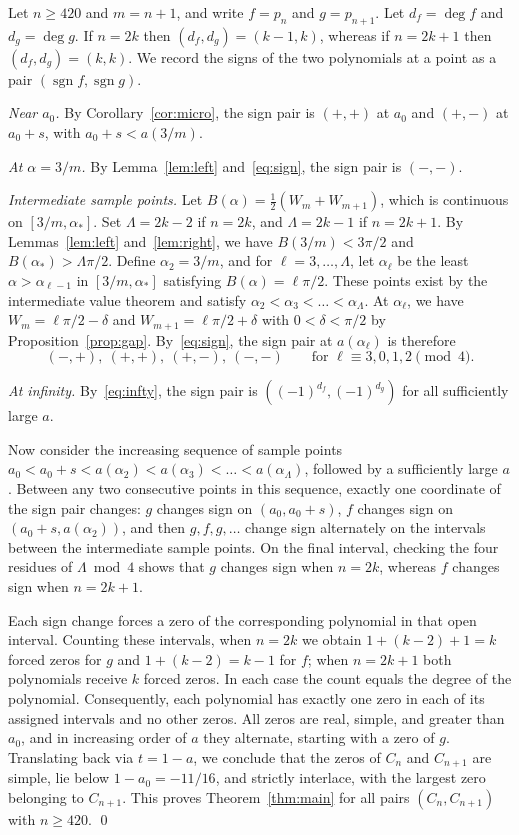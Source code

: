\documentclass[11pt]{amsart}
\theoremstyle{remark}
\newcommand{\sgn}{\operatorname{sgn}}
\begin{document}
Let $n\ge420$ and $m=n+1$, and write $f=p_n$ and $g=p_{n+1}$. Let
$d_f=\deg f$ and $d_g=\deg g$. If $n=2k$ then $(d_f,d_g)=(k-1,k)$, whereas
if $n=2k+1$ then $(d_f,d_g)=(k,k)$. We record the signs of the two
polynomials at a point as a pair $(\sgn f,\sgn g)$.

\emph{Near $a_0$.} By Corollary~\ref{cor:micro}, the sign pair is $(+,+)$ at
$a_0$ and $(+,-)$ at $a_0+s$, with $a_0+s<a(3/m)$.

\emph{At $\alpha=3/m$.} By Lemma~\ref{lem:left} and~\eqref{eq:sign}, the
sign pair is $(-,-)$.

\emph{Intermediate sample points.} Let $B(\alpha)=\frac12(W_m+W_{m+1})$,
which is continuous on $[3/m,\alpha_*]$. Set $\Lambda=2k-2$ if $n=2k$, and
$\Lambda=2k-1$ if $n=2k+1$. By Lemmas~\ref{lem:left} and~\ref{lem:right}, we
have $B(3/m)<3\pi/2$ and $B(\alpha_*)>\Lambda\pi/2$. Define $\alpha_2=3/m$,
and for $\ell=3,\dots,\Lambda$, let $\alpha_\ell$ be the least
$\alpha>\alpha_{\ell-1}$ in $[3/m,\alpha_*]$ satisfying
$B(\alpha)=\ell\pi/2$. These points exist by the intermediate value theorem
and satisfy $\alpha_2<\alpha_3<\dots<\alpha_\Lambda$. At $\alpha_\ell$, we
have $W_m=\ell\pi/2-\delta$ and $W_{m+1}=\ell\pi/2+\delta$ with
$0<\delta<\pi/2$ by Proposition~\ref{prop:gap}. By~\eqref{eq:sign}, the sign
pair at $a(\alpha_\ell)$ is therefore
\[
 (-,+),\ (+,+),\ (+,-),\ (-,-)\qquad\text{for }\ell\equiv3,0,1,2\pmod 4 .
\]

\emph{At infinity.} By~\eqref{eq:infty}, the sign pair is
$((-1)^{d_f},(-1)^{d_g})$ for all sufficiently large $a$.

Now consider the increasing sequence of sample points
$a_0<a_0+s<a(\alpha_2)<a(\alpha_3)<\dots<a(\alpha_\Lambda)$, followed by a
sufficiently large $a$. Between any two consecutive points in this sequence,
exactly one coordinate of the sign pair changes: $g$ changes sign on
$(a_0,a_0+s)$, $f$ changes sign on $(a_0+s,a(\alpha_2))$, and then
$g,f,g,\dots$ change sign alternately on the intervals between the
intermediate sample points. On the final interval, checking the four
residues of $\Lambda\bmod4$ shows that $g$ changes sign when $n=2k$, whereas
$f$ changes sign when $n=2k+1$.

Each sign change forces a zero of the corresponding polynomial in that open
interval. Counting these intervals, when $n=2k$ we obtain $1+(k-2)+1=k$
forced zeros for $g$ and $1+(k-2)=k-1$ for $f$; when $n=2k+1$ both
polynomials receive $k$ forced zeros. In each case the count equals the
degree of the polynomial. Consequently, each polynomial has exactly one zero
in each of its assigned intervals and no other zeros. All zeros are real,
simple, and greater than $a_0$, and in increasing order of $a$ they
alternate, starting with a zero of $g$. Translating back via $t=1-a$, we
conclude that the zeros of $C_n$ and $C_{n+1}$ are simple, lie below
$1-a_0=-11/16$, and strictly interlace, with the largest zero belonging to
$C_{n+1}$. This proves Theorem~\ref{thm:main} for all pairs $(C_n,C_{n+1})$
with $n\ge420$. \qed
\end{document}
